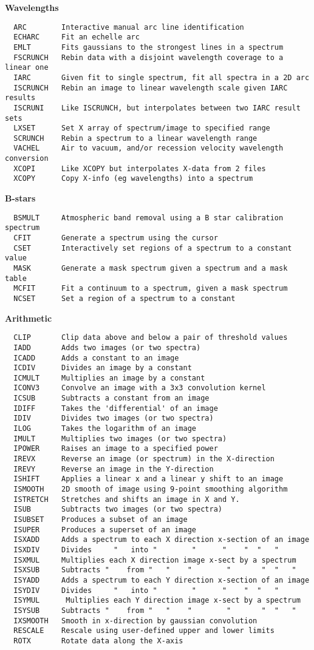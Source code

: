 \goodbreak
{\bf Wavelengths}
\begin{verbatim}
  ARC        Interactive manual arc line identification
  ECHARC     Fit an echelle arc
  EMLT       Fits gaussians to the strongest lines in a spectrum
  FSCRUNCH   Rebin data with a disjoint wavelength coverage to a linear one
  IARC       Given fit to single spectrum, fit all spectra in a 2D arc
  ISCRUNCH   Rebin an image to linear wavelength scale given IARC results
  ISCRUNI    Like ISCRUNCH, but interpolates between two IARC result sets
  LXSET      Set X array of spectrum/image to specified range
  SCRUNCH    Rebin a spectrum to a linear wavelength range
  VACHEL     Air to vacuum, and/or recession velocity wavelength conversion
  XCOPI      Like XCOPY but interpolates X-data from 2 files
  XCOPY      Copy X-info (eg wavelengths) into a spectrum
\end{verbatim}
\goodbreak
{\bf B-stars}
\begin{verbatim}
  BSMULT     Atmospheric band removal using a B star calibration spectrum
  CFIT       Generate a spectrum using the cursor
  CSET       Interactively set regions of a spectrum to a constant value
  MASK       Generate a mask spectrum given a spectrum and a mask table
  MCFIT      Fit a continuum to a spectrum, given a mask spectrum
  NCSET      Set a region of a spectrum to a constant
\end{verbatim}
\goodbreak
{\bf Arithmetic}
\begin{verbatim}
  CLIP       Clip data above and below a pair of threshold values
  IADD       Adds two images (or two spectra)
  ICADD      Adds a constant to an image
  ICDIV      Divides an image by a constant
  ICMULT     Multiplies an image by a constant
  ICONV3     Convolve an image with a 3x3 convolution kernel
  ICSUB      Subtracts a constant from an image
  IDIFF      Takes the 'differential' of an image
  IDIV       Divides two images (or two spectra)
  ILOG       Takes the logarithm of an image
  IMULT      Multiplies two images (or two spectra)
  IPOWER     Raises an image to a specified power
  IREVX      Reverse an image (or spectrum) in the X-direction
  IREVY      Reverse an image in the Y-direction
  ISHIFT     Applies a linear x and a linear y shift to an image
  ISMOOTH    2D smooth of image using 9-point smoothing algorithm
  ISTRETCH   Stretches and shifts an image in X and Y.
  ISUB       Subtracts two images (or two spectra)
  ISUBSET    Produces a subset of an image
  ISUPER     Produces a superset of an image
  ISXADD     Adds a spectrum to each X direction x-section of an image
  ISXDIV     Divides     "   into "        "      "    "  "   "
  ISXMUL     Multiplies each X direction image x-sect by a spectrum
  ISXSUB     Subtracts "    from "   "    "        "       "  "   "
  ISYADD     Adds a spectrum to each Y direction x-section of an image
  ISYDIV     Divides     "   into "        "      "    "  "   "
  ISYMUL      Multiplies each Y direction image x-sect by a spectrum
  ISYSUB     Subtracts "    from "   "    "        "       "  "   "
  IXSMOOTH   Smooth in x-direction by gaussian convolution
  RESCALE    Rescale using user-defined upper and lower limits
  ROTX       Rotate data along the X-axis
\end{verbatim}
